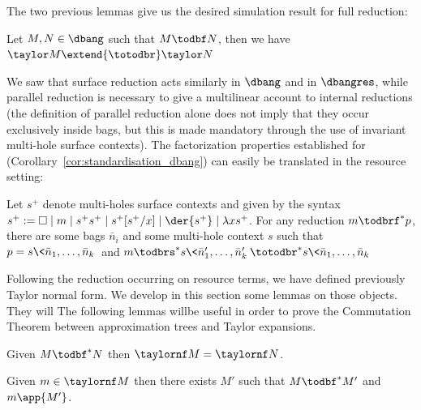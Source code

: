 The two previous lemmas give us the desired simulation result for full reduction:
\begin{theorem}\label{thm:simu_dbang_full}
	Let $M,N\in\dbang$ such that $M\todbf N$, then we have
	$
		\taylor M \extend{\totodbr}\taylor N
	$
\end{theorem}

We saw that surface reduction acts similarly in $\dbang$ and in $\dbangres$,
while parallel reduction is necessary to give a multilinear account to internal
reductions (the definition of parallel reduction alone does not imply that they
occur exclusively inside bags, but this is made mandatory through the use of invariant multi-hole
surface contexts). The factorization properties established for \dbang{}
(Corollary~\ref{cor:standardisation_dbang}) can easily be
translated in the resource setting:

\begin{proposition}[Factorization]\label{prop:standardisation_resources}

	Let $s^+$ denote multi-holes surface contexts and given by the syntax
	$
		s^+:= \square\mid m\mid	s^+s^+\mid s^+[s^+/x]\mid \der{s^+}\mid \lambda xs^+
	$.
	For any reduction $m\todbrf^* p$, there are some bags $\bar n_i$ and some
	multi-hole context $s$ such that $p=s\<\bar n_1,\dots ,\bar n_k\>$ and 
	$
		m\todbrs^*s\<\bar n_1',\dots ,\bar n_k'\>\totodbr^*s\<\bar n_1,\dots ,\bar n_k\>
	$
\end{proposition}


Following the reduction occurring on resource terms, we have defined
previously Taylor normal form. \iflong We develop in this section some lemmas
on those objects. They will \else The following lemmas will\fi be useful in order to prove the
Commutation Theorem between approximation trees and Taylor expansions. 
\begin{lemma}
	\label{lem:bohm-taylor:equiv-imply-same-nfTaylor}
	Given $M \todbf^* N$ then $\taylornf M = \taylornf N$.
\end{lemma}

\begin{lemma}
	\label{lem:taylor:approx-in-reduces-bis}
	Given $m \in \taylornf M$ then there exists $M'$ such that $M \todbf^*
	M'$ and $m\app {M'}$.
\end{lemma}


